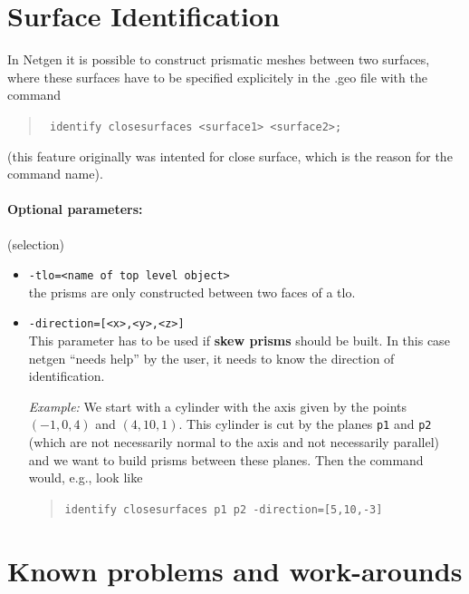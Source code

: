 \documentclass[12pt]{book}
\begin{document}
\section{Surface Identification}
In Netgen it is possible to construct prismatic meshes between two surfaces, where these surfaces
have to be specified explicitely in the .geo file with the command
\begin{quote}
  \tt
  identify closesurfaces <surface1> <surface2>;
\end{quote}
(this feature originally was intented for close surface, which is the reason for the command name).
\paragraph{Optional parameters:} (selection)
\begin{itemize}
\item \texttt{-tlo=<name of top level object>}\\
the prisms are only constructed between two faces of a tlo.
\item \texttt{-direction=[<x>,<y>,<z>]}\\
This parameter has to be used if \textbf{skew prisms} should be built. In this case netgen ``needs help'' by the user,
it needs to know the direction of identification.

\textit{Example:} We start with a cylinder with the axis given by the points $(-1,0,4)$ and $(4,10,1)$. This cylinder
is cut by the planes \texttt{p1} and \texttt{p2} (which are not necessarily normal to the axis and not necessarily parallel)
and we want to build prisms between
these planes. Then the command would, e.g., look like
\begin{quote}
\tt identify closesurfaces p1 p2 -direction=[5,10,-3]
\end{quote}
\end{itemize}







\section{Known problems and work-arounds}
\end{document}
